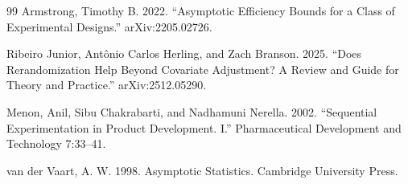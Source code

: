 \documentclass{article}
\begin{document}
\begin{thebibliography}{99}
   Armstrong, Timothy B. 2022. ``Asymptotic Efficiency Bounds for a Class of Experimental Designs.'' arXiv:2205.02726.

   Ribeiro Junior, Antônio Carlos Herling, and Zach Branson. 2025. ``Does Rerandomization Help Beyond Covariate Adjustment? A Review and Guide for Theory and Practice.'' arXiv:2512.05290.

   Menon, Anil, Sibu Chakrabarti, and Nadhamuni Nerella. 2002. ``Sequential Experimentation in Product Development. I.'' Pharmaceutical Development and Technology 7:33--41.

   van der Vaart, A. W. 1998. Asymptotic Statistics. Cambridge University Press.

\end{thebibliography}
\end{document}
